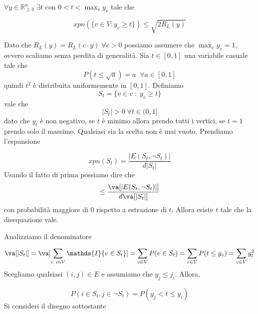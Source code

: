 \documentclass[12pt]{report}
\begin{document}
\begin{lemma}
    $\forall y \in \mathbb{R}_{\geq 0}^n \; \exists t$ con $0 < t < \max_v y_v$ tale che 

    $$xpn(\{v \in V: y_v \geq t\}) \leq \sqrt{2 R_L(y)}$$
\end{lemma}

\begin{dimo}
    Dato che $R_L(y) = R_L(c\cdot y) \; \forall c > 0$ possiamo assumere che $\max_v y_v = 1$, ovvero scaliamo senza perdita di generalità. Sia $t \in [0,1]$ una variabile casuale tale che 
    $$P(t \leq \sqrt{a}) = a \; \; \forall a \in [0,1]$$
    quindi $t^2$ è distribuita uniformemente in $[0,1]$. Definiamo $$S_t = \{v \in v\;:\; y_v \geq t\}$$vale che $$|S_t| > 0 \; \forall t \in (0,1]$$ dato che $y_t$ è non negativo, se $t$ è minimo allora prendo tutti i vertici, se $t = 1$ prendo solo il massimo. Qualsiasi sia la scelta non è mai vuoto. Prendiamo l'espansione

    $$xpn(S_t) = \frac{|E(S_t,\neg S_t)|}{d |S_t|}$$
    Usando il fatto di prima possiamo dire che
    $$\leq \frac{\va[|E(S_t,\neg S_t)|]}{d \va[|S_t|]}$$
    con probabilità maggiore di $0$ rispetto a estrazione di $t$. Allora esiste $t$ tale che la disequazione vale.

    Analizziamo il denominatore

    $$\va[|S_t|] = \va[\sum_{v \ in V} \mathds{I}\{v \in S_t\}]= \sum_{v \in V} P(v \in S_t) = \sum_{v \in V} P(t \leq y_v) = \sum_{v \in V} y_t^2$$
    Scegliamo qualsiasi $(i,j) \in E$ e assumiamo che $y_j \leq j_i$. Allora,

    $$P(i \in S_t, j \in \neg S_t) = P(y_j < t \leq y_i)$$
    Si consideri il disegno sottostante 

\end{dimo}
\end{document}
